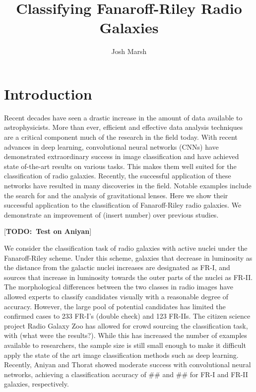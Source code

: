\documentclass{article}
\newcommand{\todo}[1]{ {\color{red}[{\bf TODO:~{#1}}]}}
\begin{document}

\title{Classifying Fanaroff-Riley Radio Galaxies}
\author{Josh Marsh}

\maketitle

\section{\label{sec:level1}Introduction}

Recent decades have seen a drastic increase in the amount of data available to astrophysicists. More than ever, efficient and effective data analysis techniques are a critical component much of the research in the field today. With recent advances in deep learning, convolutional neural networks (CNNs) have demonstrated extraordinary success in image classification and have achieved state of-the-art results on various tasks. This makes them well suited for the classification of radio galaxies. Recently, the successful application of these networks have resulted in many discoveries in the field. Notable examples include the search for and the analysis of gravitational lenses. Here we show their successful application to the classification of Fanaroff-Riley radio galaxies. We demonstrate an improvement of (insert number) over previous studies.

\todo{Test on Aniyan}

We consider the classification task of radio galaxies with active nuclei under the Fanaroff-Riley scheme. Under this scheme, galaxies that decrease in luminosity as the distance from the galactic nuclei increases are designated as FR-I, and sources that increase in luminosity towards the outer parts of the nuclei as FR-II. The morphological differences between the two classes in radio images have allowed experts to classify candidates visually with a reasonable degree of accuracy. However, the large pool of potential candidates has limited the confirmed cases to 233 FR-I's (double check) and 123 FR-IIs. The citizen science project Radio Galaxy Zoo has allowed for crowd sourcing the classification task, with (what were the results?). While this has increased the number of examples available to researchers, the sample size is still small enough to make it difficult apply the state of the art image classification methods such as deep learning. Recently, Aniyan and Thorat showed moderate success with convolutional neural networks, achieving a classification accuracy of ## and ## for FR-I and FR-II galaxies, respectively. 
\end{document}
